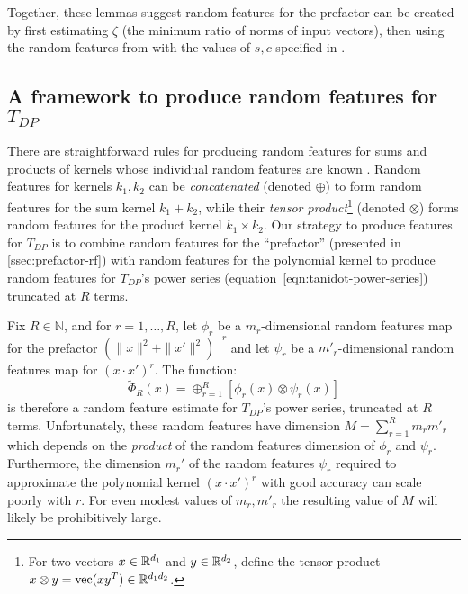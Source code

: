 Together, these lemmas suggest random features for the prefactor can be created
by first estimating $\zeta$ (the minimum ratio of norms of input vectors),
then using the random features from  with the
values of $s,c$ specified in .












\subsection{A framework to produce random features for \texorpdfstring{$T_{DP}$}{TDP}}
\label{sec:tdp-rf}

There are straightforward rules for producing random features for sums and products of kernels whose individual random features are known \citep[{\S}2.6.2]{duvenaud_2014}.
Random features for kernels $k_1,k_2$ can be \emph{concatenated} (denoted $\oplus$) to form random features for the sum kernel $k_1+k_2$,
while their \emph{tensor product}\footnote{
For two vectors $x\in\mathbb{R}^{d_1}$ and $y\in\mathbb{R}^{d_2}$, define the tensor product $x\otimes y = \text{vec}(xy^T) \in \mathbb{R}^{d_1d_2}$.
} (denoted $\otimes$)
forms random features for the product kernel $k_1\times k_2$.
Our strategy to produce features for $T_{DP}$ is
to combine random features for the ``prefactor'' (presented in \cref{ssec:prefactor-rf})
with random features for the polynomial kernel to produce random features for $T_{DP}$'s power series (equation~\ref{eqn:tanidot-power-series}) truncated at $R$ terms.

Fix $R\in\mathbb{N}$, and for $r=1,\ldots,R$, let $\phi_r$ be a $m_r$-dimensional random features map for the prefactor
$\textstyle (\|x\|^2 + \|x'\|^2)^{-r}$ and let $\psi_r$ be a $m'_r$-dimensional random features map for
$\left(x\cdot x'\right)^r$. The function:
\begin{equation}\label{naive tensor product rfs}
    \tilde\Phi_R(x) = \oplus_{r=1}^R \left[\phi_r(x) \otimes \psi_r(x)\right]
\end{equation}
is therefore a random feature estimate for $T_{DP}$'s power series, truncated at $R$ terms.
Unfortunately, these random features have dimension 
$M=\sum_{r=1}^R m_r m'_r$
which depends on the \emph{product} of the random features dimension of $\phi_r$ and $\psi_r$. Furthermore, the dimension $m_r'$ of the random features $\psi_r$ required to approximate the polynomial kernel $(x\cdot x')^r$ with good accuracy can scale poorly with $r$.
For even modest values of $m_r,m'_r$ the resulting value of $M$ will likely be prohibitively large.

